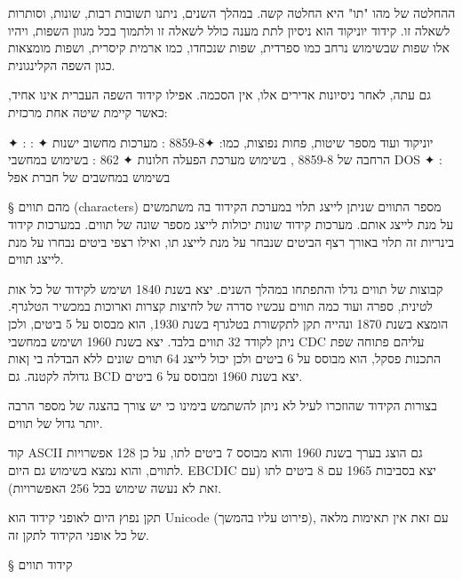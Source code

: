 ההחלטה של מהו "תו" היא החלטה קשה. במהלך השנים, ניתנו תשובות רבות, שונות, וסותרות לשאלה זו. קידוד יוניקוד הוא ניסיון לתת מענה כולל לשאלה זו ולתמוך בכל מגוון השפות, ויהיו אלו שפות שבשימוש נרחב כמו ספרדית, שפות שנכחדו, כמו ארמית קיסרית, ושפות מומצאות כגון השפה הקלינגונית.

גם עתה, לאחר ניסיונות אדירים אלו, אין הסכמה. אפילו קידוד השפה העברית אינו אחיד, כאשר קיימת שיטה אחת מרכזית:
\begin{itemize}
✦ : יוניקוד
ועוד מספר שיטות, פחות נפוצות, כמו:
✦8859-8 : מערכות מחשוב ישנות
✦ : הרחבה של 8859-8 , בשימוש מערכת הפעלה חלונות
✦ 862 : בשימוש במחשבי DOS
✦ : בשימוש במחשבים של חברת אפל
\end{itemize}

§ מהם תווים (characters)
מספר התווים שניתן לייצג תלוי במערכת הקידוד בה משתמשים על מנת לייצג אותם. מערכות קידוד שונות יכולות לייצג מספר שונה של תווים. במערכות קידוד בינריות זה תלוי באורך רצף הביטים שנבחר על מנת לייצג תו, ואילו רצפי ביטים נבחרו על מנת לייצג תווים.

קבוצות של תווים גדלו והתפתחו במהלך השנים.  יצא בשנת 1840 ושימש לקידוד של כל אות לטינית, ספרה ועוד כמה תווים עכשיו סדרה של לחיצות קצרות וארוכות במכשיר הטלגרף.  הומצא בשנת 1870 ונהייה תקן לתקשורת בטלגרף בשנת 1930, הוא מבסוס על 5 ביטים, ולכן ניתן לקודד 32 תווים בלבד.  יצא בשנת 1960 ושימש במחשבי CDC עליהם פתוחה שפת התכנות פסקל, הוא מבוסס על 6 ביטים ולכן יכול לייצג 64 תווים שונים ללא הבדלה בי ןאות גדולה לקטנה. גם BCD יצא בשנת 1960 ומבוסס על 6 ביטים.

בצורות הקידוד שהוזכרו לעיל לא ניתן להשתמש בימינו כי יש צורך בהצגה של מספר הרבה יותר גדול של תווים.

קוד ASCII גם הוצג בערך בשנת 1960 והוא מבוסס 7 ביטים לתו, על כן 128 אפשרויות לתווים, והוא נמצא בשימוש גם היום. EBCDIC יצא בסביבות 1965 עם 8 ביטים לתו (עם זאת לא נעשה שימוש בכל 256 האפשרויות).

תקן נפוץ היום לאופני קידוד הוא Unicode (פירוט עליו בהמשך), עם זאת אין תאימות מלאה של כל אופני הקידוד לתקן זה.

§ קידוד תווים
